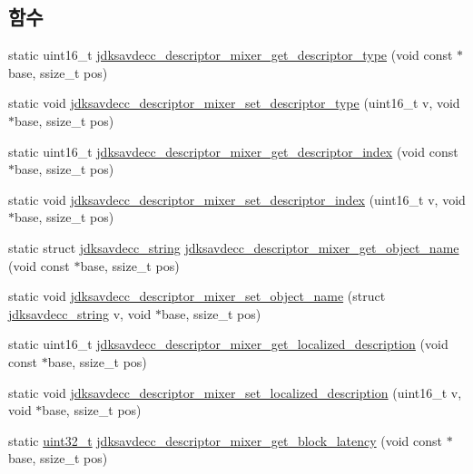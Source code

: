 \subsection*{함수}
\begin{DoxyCompactItemize}
\item 
static uint16\+\_\+t \hyperlink{group__descriptor__mixer_gae01356ed1dee84ca0063ea01ccf2a0e7}{jdksavdecc\+\_\+descriptor\+\_\+mixer\+\_\+get\+\_\+descriptor\+\_\+type} (void const $\ast$base, ssize\+\_\+t pos)
\item 
static void \hyperlink{group__descriptor__mixer_ga619e4732867736aac6ea6f4c536355ca}{jdksavdecc\+\_\+descriptor\+\_\+mixer\+\_\+set\+\_\+descriptor\+\_\+type} (uint16\+\_\+t v, void $\ast$base, ssize\+\_\+t pos)
\item 
static uint16\+\_\+t \hyperlink{group__descriptor__mixer_ga21b50932f50ee468878b28d9dca98c14}{jdksavdecc\+\_\+descriptor\+\_\+mixer\+\_\+get\+\_\+descriptor\+\_\+index} (void const $\ast$base, ssize\+\_\+t pos)
\item 
static void \hyperlink{group__descriptor__mixer_gac1b0547c5bdd1750428190db2d96ab30}{jdksavdecc\+\_\+descriptor\+\_\+mixer\+\_\+set\+\_\+descriptor\+\_\+index} (uint16\+\_\+t v, void $\ast$base, ssize\+\_\+t pos)
\item 
static struct \hyperlink{structjdksavdecc__string}{jdksavdecc\+\_\+string} \hyperlink{group__descriptor__mixer_gabf989a189d4d3b53f468fed26860bec6}{jdksavdecc\+\_\+descriptor\+\_\+mixer\+\_\+get\+\_\+object\+\_\+name} (void const $\ast$base, ssize\+\_\+t pos)
\item 
static void \hyperlink{group__descriptor__mixer_gaf741a5d83ddbe3a7828272aa6bc94093}{jdksavdecc\+\_\+descriptor\+\_\+mixer\+\_\+set\+\_\+object\+\_\+name} (struct \hyperlink{structjdksavdecc__string}{jdksavdecc\+\_\+string} v, void $\ast$base, ssize\+\_\+t pos)
\item 
static uint16\+\_\+t \hyperlink{group__descriptor__mixer_gafc03dd5a79e12367dfddb5047d7a26e7}{jdksavdecc\+\_\+descriptor\+\_\+mixer\+\_\+get\+\_\+localized\+\_\+description} (void const $\ast$base, ssize\+\_\+t pos)
\item 
static void \hyperlink{group__descriptor__mixer_gae1361e1b7194cde00a440257c1cf6356}{jdksavdecc\+\_\+descriptor\+\_\+mixer\+\_\+set\+\_\+localized\+\_\+description} (uint16\+\_\+t v, void $\ast$base, ssize\+\_\+t pos)
\item 
static \hyperlink{parse_8c_a6eb1e68cc391dd753bc8ce896dbb8315}{uint32\+\_\+t} \hyperlink{group__descriptor__mixer_ga46a54db0b03d4891da41685f128a8a64}{jdksavdecc\+\_\+descriptor\+\_\+mixer\+\_\+get\+\_\+block\+\_\+latency} (void const $\ast$base, ssize\+\_\+t pos)

\end{DoxyCompactItemize}
